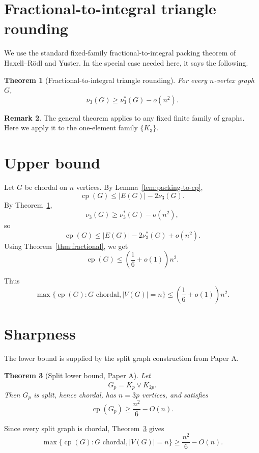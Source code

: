 \documentclass[11pt]{article}
\newtheorem{theorem}{Theorem}[section]
\theoremstyle{definition}
\newtheorem{remark}[theorem]{Remark}
\newcommand{\cp}{\operatorname{cp}}
\begin{document}
\section{Fractional-to-integral triangle rounding}

We use the standard fixed-family fractional-to-integral packing theorem of Haxell--Rödl and Yuster. In the special case needed here, it says the following.

\begin{theorem}[Fractional-to-integral triangle rounding]\label{thm:rounding}
For every \(n\)-vertex graph \(G\),
\[
    \nu_3(G)\ge \nu_3^*(G)-o(n^2).
\]
\end{theorem}

\begin{remark}
The general theorem applies to any fixed finite family of graphs. Here we apply it to the one-element family \(\{K_3\}\).
\end{remark}

\section{Upper bound}

Let \(G\) be chordal on \(n\) vertices. By Lemma~\ref{lem:packing-to-cp},
\[
    \cp(G)
    \le
    |E(G)|-2\nu_3(G).
\]
By Theorem~\ref{thm:rounding},
\[
    \nu_3(G)\ge\nu_3^*(G)-o(n^2),
\]
so
\[
    \cp(G)
    \le
    |E(G)|-2\nu_3^*(G)+o(n^2).
\]
Using Theorem~\ref{thm:fractional}, we get
\[
    \cp(G)
    \le
    \left(\frac16+o(1)\right)n^2.
\]

Thus
\[
    \max\{\cp(G):G\text{ chordal}, |V(G)|=n\}
    \le
    \left(\frac16+o(1)\right)n^2.
\]

\section{Sharpness}

The lower bound is supplied by the split graph construction from Paper A.

\begin{theorem}[Split lower bound, Paper A]\label{thm:split-lower}
Let
\[
    G_p=K_p\vee\overline{K}_{2p}.
\]
Then \(G_p\) is split, hence chordal, has \(n=3p\) vertices, and satisfies
\[
    \cp(G_p)\ge \frac{n^2}{6}-O(n).
\]
\end{theorem}

Since every split graph is chordal, Theorem~\ref{thm:split-lower} gives
\[
    \max\{\cp(G):G\text{ chordal}, |V(G)|=n\}
    \ge
    \frac{n^2}{6}-O(n).
\]
\end{document}
